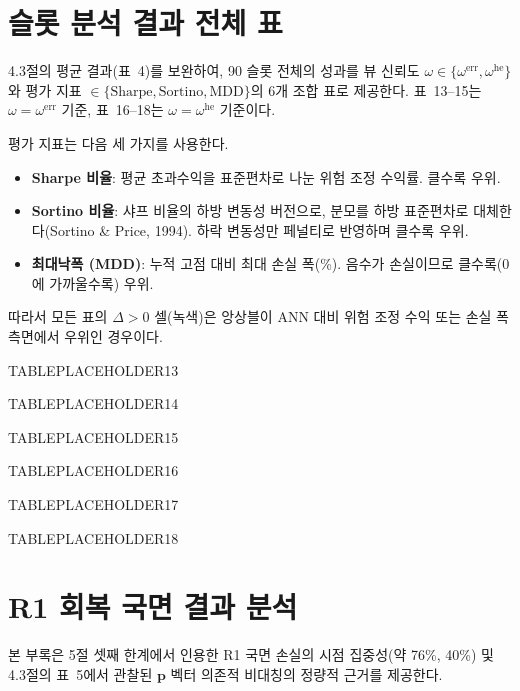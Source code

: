\documentclass{article}
\begin{document}
\section{슬롯 분석 결과 전체 표}\label{app:result_table}

4.3절의 평균 결과(표~4)를 보완하여, 90 슬롯 전체의 성과를 뷰 신뢰도 $\omega \in \{\omega^{\mathrm{err}}, \omega^{\mathrm{he}}\}$와 평가 지표 $\in \{\text{Sharpe}, \text{Sortino}, \text{MDD}\}$의 6개 조합 표로 제공한다. 표~13--15는 $\omega = \omega^{\mathrm{err}}$ 기준, 표~16--18는 $\omega = \omega^{\mathrm{he}}$ 기준이다.

평가 지표는 다음 세 가지를 사용한다.
\begin{itemize}
  \item \textbf{Sharpe 비율}: 평균 초과수익을 표준편차로 나눈 위험 조정 수익률. 클수록 우위.
  \item \textbf{Sortino 비율}: 샤프 비율의 하방 변동성 버전으로, 분모를 하방 표준편차로 대체한다(Sortino & Price, 1994). 하락 변동성만 페널티로 반영하며 클수록 우위.
  \item \textbf{최대낙폭 (MDD)}: 누적 고점 대비 최대 손실 폭(\%). 음수가 손실이므로 클수록(0 에 가까울수록) 우위.
\end{itemize}
따라서 모든 표의 $\Delta > 0$ 셀(녹색)은 앙상블이 ANN 대비 위험 조정 수익 또는 손실 폭 측면에서 우위인 경우이다.



TABLEPLACEHOLDER13





TABLEPLACEHOLDER14






TABLEPLACEHOLDER15






TABLEPLACEHOLDER16






TABLEPLACEHOLDER17





TABLEPLACEHOLDER18



\section{R1 회복 국면 결과 분석}\label{app:r1}

본 부록은 5절 셋째 한계에서 인용한 R1 국면 손실의 시점 집중성(약 76\%, 40\%) 및 4.3절의 표~5에서 관찰된 $\mathbf{p}$ 벡터 의존적 비대칭의 정량적 근거를 제공한다.
\end{document}
